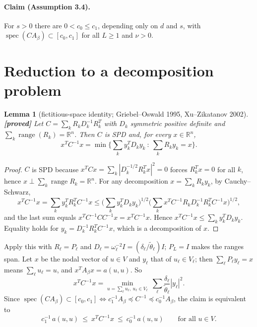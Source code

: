 \documentclass[11pt,a4paper]{article}
\newtheorem{lemma}[theorem]{Lemma}
\theoremstyle{remark}
\newcommand{\R}{\mathbb{R}}
\begin{document}
\paragraph{Claim (Assumption 3.4).} For $s>0$ there are $0<c_0\le c_1$,
depending only on $d$ and $s$, with $\operatorname{spec}(CA_\beta)\subset[c_0,c_1]$ for all $L\ge1$ and
$\nu>0$.

\section{Reduction to a decomposition problem}

\begin{lemma}[fictitious-space identity; Griebel--Oswald 1995, Xu--Zikatanov 2002]\label{lem:lions}\textbf{[proved]}
Let $C=\sum_kR_kD_k^{-1}R_k^T$ with $D_k$ symmetric positive definite and
$\sum_k\operatorname{range}(R_k)=\R^n$. Then $C$ is SPD and, for every $x\in\R^n$,
\[
x^TC^{-1}x=\min\Big\{\sum_ky_k^TD_ky_k\ :\ \sum_kR_ky_k=x\Big\}.
\]
\end{lemma}
\begin{proof}
$C$ is SPD because $x^TCx=\sum_k|D_k^{-1/2}R_k^Tx|^2=0$ forces $R_k^Tx=0$ for all $k$,
hence $x\perp\sum_k\operatorname{range}R_k=\R^n$. For any decomposition $x=\sum_kR_ky_k$, by
Cauchy--Schwarz,
\[
x^TC^{-1}x=\sum_ky_k^TR_k^TC^{-1}x
\le\Big(\sum_ky_k^TD_ky_k\Big)^{1/2}\Big(\sum_kx^TC^{-1}R_kD_k^{-1}R_k^TC^{-1}x\Big)^{1/2},
\]
and the last sum equals $x^TC^{-1}CC^{-1}x=x^TC^{-1}x$. Hence $x^TC^{-1}x\le\sum_ky_k^TD_ky_k$.
Equality holds for $y_k=D_k^{-1}R_k^TC^{-1}x$, which is a decomposition of $x$.
\end{proof}

Apply this with $R_\ell=P_\ell$ and $D_\ell=\omega_\ell^{-2}I=(\delta_\ell/\tilde\theta_\ell)I$; $P_L=I$ makes
the ranges span. Let $x$ be the nodal vector of $u\in V$ and $y_\ell$ that of
$u_\ell\in V_\ell$; then $\sum_\ell P_\ell y_\ell=x$ means $\sum_\ell u_\ell=u$, and $x^TA_\beta x=a(u,u)$. So
\begin{equation}\label{eq:lions}
x^TC^{-1}x=\min_{u=\sum_\ell u_\ell,\ u_\ell\in V_\ell}\ \sum_\ell\frac{\delta_\ell}{\tilde\theta_\ell}|y_\ell|^2 .
\end{equation}
Since $\operatorname{spec}(CA_\beta)\subset[c_0,c_1]\iff c_1^{-1}A_\beta\preceq C^{-1}\preceq c_0^{-1}A_\beta$, the claim is
equivalent to
\begin{equation}\label{eq:twosided}
c_1^{-1}\,a(u,u)\ \le\ x^TC^{-1}x\ \le\ c_0^{-1}\,a(u,u)\qquad\text{for all }u\in V.
\end{equation}
\end{document}
